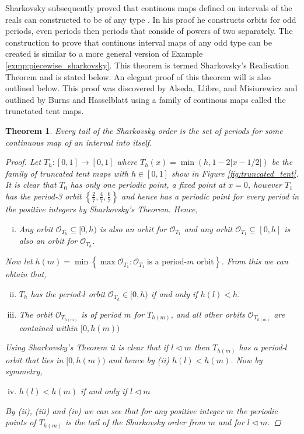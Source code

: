 \documentclass[11pt,a4paper,oneside]{memoir}
\theoremstyle{plain}
\newtheorem{thm}{Theorem}[chapter]
\theoremstyle{definition}
\begin{document}
Sharkovsky subsequently proved that continous maps defined on intervals of the reals can constructed to be of any type \cite{sharkovsky} \cite{sharkovsky2}. In his proof he constructs orbits for odd periods, even periods then periods that conside of powers of two separately. The construction to prove that continous interval maps of any odd type can be created is similar to a more general version of Example \ref{exmp:piecewise_sharkovsky}. This theorem is termed Sharkovsky's Realisation Theorem and is stated below. An elegant proof of this theorem will is also outlined below. This proof was discovered by Alseda, Llibre, and Misiurewicz \cite[Section 2.2]{alm} and outlined by Burns and Hasselblatt \cite[Section 7]{burns-hasselblatt} using a family of continous maps called the trunctated tent maps.

\begin{thm}
    Every tail of the Sharkovsky order is the set of periods for some continuous map of an interval into itself.
    \begin{proof}
        Let $T_h: [0, 1] \to [0, 1]$ where $T_h(x) = \min(h, 1-2|x-1/2|)$ be the family of truncated tent maps with $h \in [0, 1]$ show in Figure \ref{fig:truncated_tent}. It is clear that $T_0$ has only one periodic point, a fixed point at $x = 0$, however $T_1$ has the period-3 orbit $\left\lbrace \frac{2}{7}, \frac{4}{7}, \frac{6}{7} \right\rbrace$ and hence has a periodic point for every period in the positive integers by Sharkovsky's Theorem. Hence,
        \begin{enumerate}[(i)]
            \item Any orbit $\mathcal{O}_{T_h} \subseteq [0, h)$ is also an orbit for $\mathcal O_{T_1}$ and any orbit $\mathcal{O}_{T_1} \subseteq [0, h]$ is also an orbit for $\mathcal{O}_{T_h}$.
        \end{enumerate}
        Now let $h(m) = \min \left\lbrace \max \mathcal{O}_{T_1} : \mathcal{O}_{T_1} \ \text{is a period-$m$ orbit} \right\rbrace$. From this we can obtain that,
        
        \begin{enumerate}[(i)]\setcounter{enumi}{1}
            \item $T_h$ has the period-$l$ orbit $\mathcal{O}_{T_h} \in [0, h)$ if and only if $h(l) < h$.
            \item The orbit $\mathcal{O}_{T_{h(m)}}$ is of period $m$ for $T_{h(m)}$, and all other orbits $\mathcal{O}_{T_{h(m)}}$ are contained within $[0, h(m))$
        \end{enumerate}
        Using Sharkovsky's Theorem it is clear that if $l \lhd m$ then $T_{h(m)}$ has a period-$l$ orbit that lies in $[0, h(m))$ and hence by (ii) $h(l) < h(m)$. Now by symmetry,
        \begin{enumerate}[(i)]\setcounter{enumi}{3}
            \item $h(l) < h(m)$ if and only if $l \lhd m$
        \end{enumerate}
        By (ii), (iii) and (iv) we can see that for any positive integer $m$ the periodic points of $T_{h(m)}$ is the tail of the Sharkovsky order from $m$ and for $l \lhd m$.


\end{proof}
\end{thm}
\end{document}
